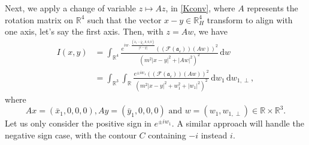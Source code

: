 \documentclass{article}
\newcommand{\infixand}{\text{ and }}
\newcommand{\mathd}{\mathrm{d}}
\begin{document}
%
Next, we apply a change of variable $z \mapsto A z$, in \eqref{Kconv}, where $A$ represents the rotation matrix on $\mathbb{R}^4$ such that the vector $x - y \in
\mathbb{R}^4_H$ transform to align with one axis, let's say the first axis. Then, with $z =A w$, we have 
%
\begin{align}
    I (x, y) &  =  \int_{\mathbb{R}^4} \frac{e^{i w \cdot \frac{(\bar{x}_1 -
    \bar{y}_1, 0, 0, 0)}{| x - y |}} ((\mathcal{F}
    (\mathfrak{a}_{\varepsilon})) (A w))^2}{(m^2 | x - y |^2 + | A w |^2)^2} \, 
    \mathd w \nonumber \\
    & =  \int_{\mathbb{R}^3} \int_{\mathbb{R}} \frac{e^{\pm i w_1}
    ((\mathcal{F} (\mathfrak{a}_{\varepsilon})) (A w))^2}{(m^2 | x - y |^2 +     w_1^2 + | w_1 |^2)^2} \, \mathd w_1 \, \mathd w_{1, \perp},
  \label{I3a}
\end{align}
where
\[ 
     A x = (\bar{x}_1, 0, 0, 0), A y = (\bar{y}_1, 0, 0, 0) \infixand w =
     (w_1, w_{1, \perp}) \in \mathbb{R} \times \mathbb{R}^3 .
   \]
Let us only consider the positive sign in $e^{\pm i w_1}$. A similar approach will handle the negative sign case, with the contour $C$ containing $-i$ instead $i$.
\end{document}
